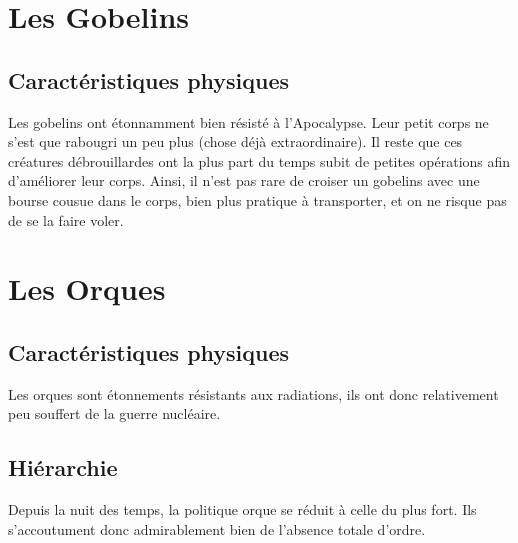 \section{Les Gobelins}
\subsection{Caractéristiques physiques}
Les gobelins ont étonnamment bien résisté à l'Apocalypse. Leur petit corps ne s'est que rabougri un peu plus (chose déjà extraordinaire). Il reste que ces créatures débrouillardes ont la plus part du temps subit de petites opérations afin d'améliorer leur corps. Ainsi, il n'est pas rare de croiser un gobelins avec une bourse cousue dans le corps, bien plus pratique à transporter, et on ne risque pas de se la faire voler. 
\section{Les Orques}
\subsection{Caractéristiques physiques}
Les orques sont étonnements résistants aux radiations, ils ont donc relativement peu souffert de la guerre nucléaire.
\subsection{Hiérarchie}
Depuis la  nuit des temps, la politique orque se réduit à celle du plus fort. Ils s'accoutument donc admirablement bien de l'absence totale d'ordre.